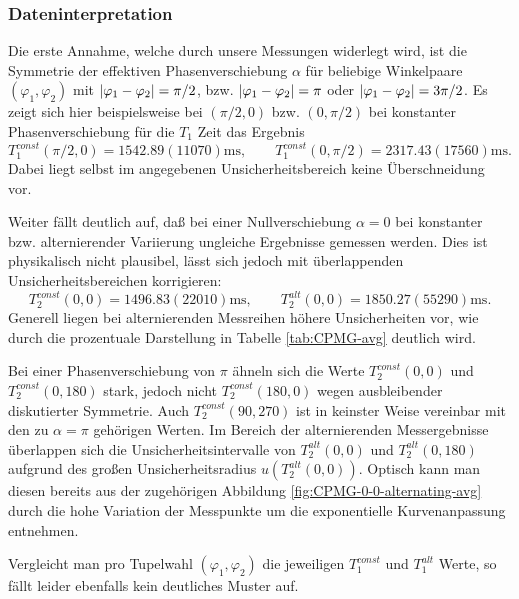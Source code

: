 \documentclass[../../main.tex]{subfiles}
\begin{document}
        \subsubsection*{Dateninterpretation}
            Die erste Annahme, welche durch unsere Messungen widerlegt wird, ist die Symmetrie der effektiven Phasenverschiebung $\alpha$ für beliebige Winkelpaare $(\varphi_1,\varphi_2)$ mit $\abs{\varphi_1 - \varphi_2} = \pi/2$, bzw. $\abs{\varphi_1 - \varphi_2} = \pi$ oder $\abs{\varphi_1 - \varphi_2} = 3\pi/2$. Es zeigt sich hier beispielsweise bei $(\pi/2,0)$ bzw. $(0,\pi/2)$ bei konstanter Phasenverschiebung für die $T_1$ Zeit das Ergebnis
            \[
                T_1^{\textit{const}}(\pi/2,0) = 1542.89(11070)\si{\ms},\qquad T_1^{\textit{const}}(0,\pi/2) = 2317.43(17560)\si{\ms}.
            \]
            Dabei liegt selbst im angegebenen Unsicherheitsbereich keine Überschneidung vor. 

            Weiter fällt deutlich auf, daß bei einer Nullverschiebung $\alpha = 0$ bei konstanter bzw. alternierender Variierung ungleiche Ergebnisse gemessen werden. Dies ist physikalisch nicht plausibel, lässt sich jedoch mit überlappenden Unsicherheitsbereichen korrigieren:
            \[
                T_2^{\textit{const}}(0,0) = 1496.83(22010)\si{\ms},\qquad T_2^{\textit{alt}}(0,0) = 1850.27(55290)\si{\ms}.
            \]
            Generell liegen bei alternierenden Messreihen höhere Unsicherheiten vor, wie durch die prozentuale Darstellung in Tabelle \ref{tab:CPMG-avg} deutlich wird. 

            Bei einer Phasenverschiebung von $\pi$ ähneln sich die Werte $T_2^{\textit{const}}(0,0)$ und $T_2^{\textit{const}}(0,180)$ stark, jedoch nicht $T_2^{\textit{const}}(180,0)$ wegen ausbleibender diskutierter Symmetrie. Auch $T_2^{\textit{const}}(90,270)$ ist in keinster Weise vereinbar mit den zu $\alpha = \pi$ gehörigen Werten. Im Bereich der alternierenden Messergebnisse überlappen sich die Unsicherheitsintervalle von $T_2^{\textit{alt}}(0,0)$ und $T_2^{\textit{alt}}(0,180)$ aufgrund des großen Unsicherheitsradius $u(T_2^{\textit{alt}}(0,0))$. Optisch kann man diesen bereits aus der zugehörigen Abbildung \ref{fig:CPMG-0-0-alternating-avg} durch die hohe Variation der Messpunkte um die exponentielle Kurvenanpassung entnehmen.
            
            Vergleicht man pro Tupelwahl $(\varphi_1,\varphi_2)$ die jeweiligen $T_1^{\textit{const}}$ und $T_1^{\textit{alt}}$ Werte, so fällt leider ebenfalls kein deutliches Muster auf. 
\end{document}
